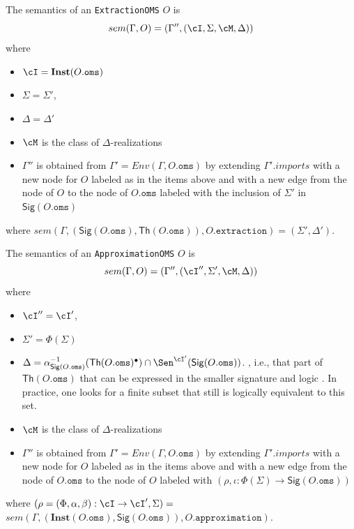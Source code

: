 \documentclass[10pt, a4paper]{isov2}
\newcommand*{\syntax}[1]{\texttt{#1}}
\newcommand{\Sig}{\mathsf{Sig}}
\renewcommand{\Th}{\mathsf{Th}}
\newcommand{\Inst}{\ensuremath{\mathbf{Inst}}}
\begin{document}
The semantics of an \syntax{ExtractionOMS} $O$
is
$$sem(\Gamma, O) = (\Gamma'',(\cI,\Sigma,\cM,\Delta))$$
\noindent where
\begin{itemize}
  \item $\cI = \Inst(O.\syntax{oms})$
  \item $\Sigma = \Sigma'$,
  \item $\Delta = \Delta'$
  \item $\cM$ is the class of $\Delta$-realizations
  \item $\Gamma''$ is obtained from
       $\Gamma' = Env(\Gamma, O.\syntax{oms})$
       by extending $\Gamma'.imports$
        with a new node for $O$ labeled as in the items above
        and with a new edge from the node of $O$ to the node of
        $O.\syntax{oms}$ labeled with
        the inclusion of $\Sigma'$ in $\Sig(O.\syntax{oms})$
\end{itemize}
where
$sem(\Gamma, (\Sig(O.\syntax{oms}), \Th(O.\syntax{oms})), O.\syntax{extraction}) =
(\Sigma',\Delta')$.

The semantics of an \syntax{ApproximationOMS} $O$ is
$$sem(\Gamma, O) = (\Gamma'',(\cI'',\Sigma',\cM,\Delta))$$
\noindent where
\begin{itemize}
  \item $\cI'' = \cI'$,
  \item $\Sigma' = \Phi(\Sigma)$
  \item $\Delta = \alpha^{-1}_{\Sig(O.\syntax{oms})}(\Th(O.\syntax{oms})^\bullet)\cap\Sen^{\cI'}(\Sig(O.\syntax{oms}))$.
, i.e., that part of $\Th(O.\syntax{oms})$ that can be expressed in the smaller signature and logic . In  practice, one looks for a finite subset that still is logically equivalent to this set.
  \item $\cM$ is the class of $\Delta$-realizations
  \item $\Gamma''$ is obtained from
       $\Gamma' = Env(\Gamma, O.\syntax{oms})$
       by extending $\Gamma'.imports$
        with a new node for $O$ labeled as in the items above
        and with a new edge from the node of $O.\syntax{oms}$ to the node of $O$
        labeled with $(\rho,\iota: \Phi(\Sigma) \to \Sig(O.\syntax{oms}))$
\end{itemize}
\noindent where  $(\rho = (\Phi,\alpha,\beta):\cI\to\cI',\Sigma) =$ \\ $sem(\Gamma, (\Inst(O.\syntax{oms}), \Sig(O.\syntax{oms})), O.\syntax{approximation})$.
\end{document}
